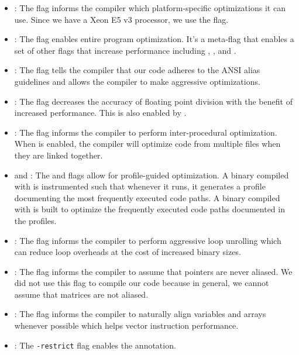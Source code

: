 \begin{itemize}
  \item {}:
    The  flag informs the compiler which platform-specific
    optimizations it can use. Since we have a Xeon E5 v3 processor, we use the
     flag.

  \item {}:
    The  flag enables entire program optimization. It's a meta-flag
    that enables a set of other flags that increase performance including
    , , and .

  \item {}:
    The  flag tells the compiler that our code adheres to the
    ANSI alias guidelines and allows the compiler to make aggressive
    optimizations.

  \item {}:
    The  flag decreases the accuracy of floating point
    division with the benefit of increased performance. This is also enabled by
    .

  \item {}:
    The  flag informs the compiler to perform inter-procedural
    optimization. When  is enabled, the compiler will optimize code
    from multiple files when they are linked together.

  \item {} and :
    The  and  flags allow for profile-guided
    optimization. A binary compiled with  is instrumented such
    that whenever it runs, it generates a profile documenting the most
    frequently executed code paths. A binary compiled with  is
    built to optimize the frequently executed code paths documented in the
    profiles.

  \item {}:
    The  flag informs the compiler to perform aggressive
    loop unrolling which can reduce loop overheads at the cost of increased
    binary sizes.

  \item {}:
    The  flag informs the compiler to assume that pointers are
    never aliased. We did not use this flag to compile our code because in
    general, we cannot assume that matrices are not aliased.

  \item {}:
    The  flag informs the compiler to naturally align variables and
    arrays whenever possible which helps vector instruction performance.

  \item {}:
    The \texttt{-restrict} flag enables the  annotation.
\end{itemize}

